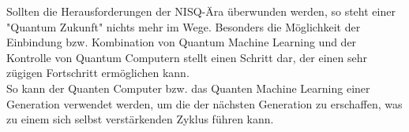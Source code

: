 Sollten die Herausforderungen der NISQ-Ära überwunden werden, so steht einer "Quantum Zukunft" nichts mehr im Wege. Besonders die Möglichkeit der Einbindung bzw. Kombination von Quantum Machine Learning und der Kontrolle von Quantum Computern stellt einen Schritt dar, der einen sehr zügigen Fortschritt ermöglichen kann.\\ So kann der Quanten Computer bzw. das Quanten Machine Learning einer Generation verwendet werden, um die der nächsten Generation zu erschaffen, was zu einem sich selbst verstärkenden Zyklus führen kann. \\

